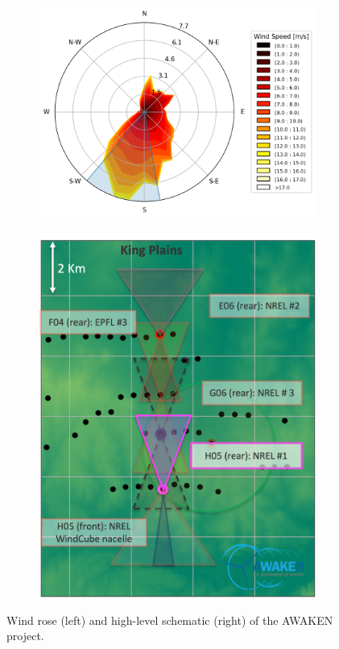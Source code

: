 \documentclass[%
 aip,
 amsmath,
 amssymb,
preprint,%
]{revtex4-2}
\begin{document}
\begin{figure}[htbp]
  \centering
  \begin{subfigure}[b]{0.6\columnwidth}
    \includegraphics[width=\columnwidth]{figs/windrose_20240828.png}
  \end{subfigure}
  \begin{subfigure}[b]{0.38\columnwidth}
    \includegraphics[width=\columnwidth]{figs/awakenSchem_20240923.png}
  \end{subfigure}
  \caption{Wind rose (left) and high-level schematic (right) of the AWAKEN project.}
  \label{fig:awakenSchem}
\end{figure}
\end{document}
